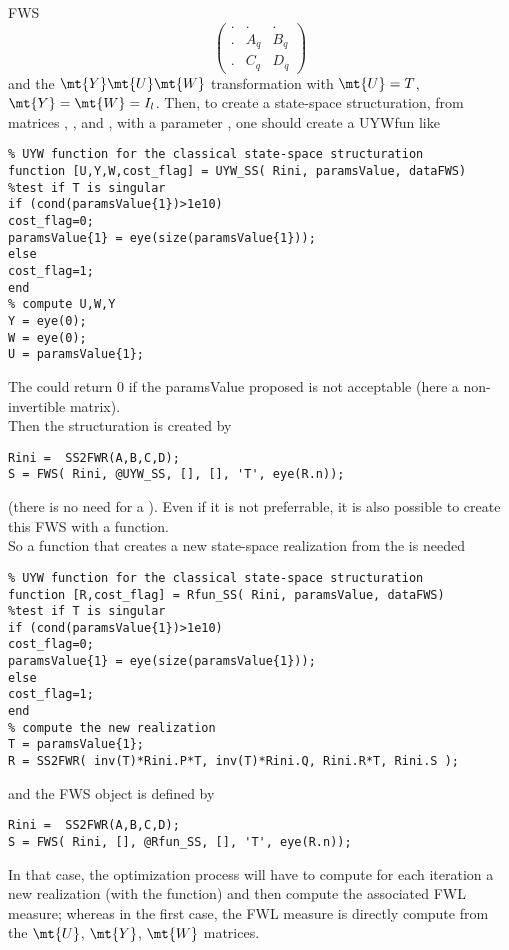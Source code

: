 \begin{command}{FWS}
\begin{equation}
\begin{pmatrix}
. & . & . \\
. & A_q & B_q \\
. & C_q & D_q
\end{pmatrix}
\end{equation}
and the $\mt{Y}\mt{U}\mt{W}$ transformation with $\mt{U}=T$, $\mt{Y}=\mt{W}=I_{l}$.
Then, to create a state-space structuration, from matrices , ,  and ,
with a parameter , one should create a UYWfun like
\begin{verbatim}
% UYW function for the classical state-space structuration
function [U,Y,W,cost_flag] = UYW_SS( Rini, paramsValue, dataFWS)
%test if T is singular
if (cond(paramsValue{1})>1e10)
cost_flag=0;
paramsValue{1} = eye(size(paramsValue{1}));
else
cost_flag=1;
end
% compute U,W,Y
Y = eye(0);
W = eye(0);
U = paramsValue{1};
\end{verbatim}
The  could return $0$ if the paramsValue proposed is not acceptable (here a non-invertible matrix).\\
Then the structuration is created by
\begin{verbatim}
Rini =  SS2FWR(A,B,C,D);
S = FWS( Rini, @UYW_SS, [], [], 'T', eye(R.n));
\end{verbatim}
(there is no need for a ).
Even if it is not preferrable, it is also possible to create this FWS with a  function.\\
So a function that creates a new state-space realization from the  is needed
\begin{verbatim}
% UYW function for the classical state-space structuration
function [R,cost_flag] = Rfun_SS( Rini, paramsValue, dataFWS)
%test if T is singular
if (cond(paramsValue{1})>1e10)
cost_flag=0;
paramsValue{1} = eye(size(paramsValue{1}));
else
cost_flag=1;
end
% compute the new realization
T = paramsValue{1};
R = SS2FWR( inv(T)*Rini.P*T, inv(T)*Rini.Q, Rini.R*T, Rini.S );
\end{verbatim}
and the FWS object is defined by
\begin{verbatim}
Rini =  SS2FWR(A,B,C,D);
S = FWS( Rini, [], @Rfun_SS, [], 'T', eye(R.n));
\end{verbatim}
In that case, the optimization process will have to compute for each iteration a new realization (with the  function)
and then compute the associated FWL measure; whereas in the first case, the FWL measure is directly compute from the $\mt{U}$,
$\mt{Y}$, $\mt{W}$ matrices.
\end{command}


